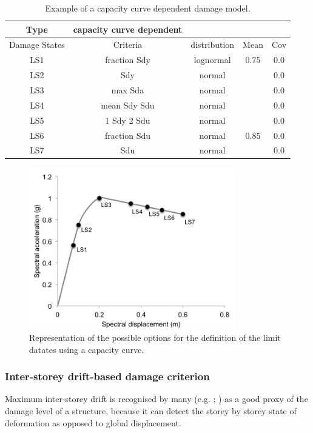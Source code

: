\begin {table}[htb]
\caption{Example of a capacity curve dependent damage model.}
\label{table:cc_dmg}
\begin{center}
  \begin{tabular}{ | c | c | c | c | c |}
  \hline
    Type & capacity curve dependent &  &  & \\ \hline
    Damage States & Criteria & distribution & Mean & Cov \\ \hline
    LS1 & fraction Sdy & lognormal & 0.75 & 0.0 \\ \hline
    LS2 & Sdy & normal &  & 0.0 \\ \hline
    LS3 & max Sda & normal &  & 0.0 \\ \hline
    LS4 & mean Sdy Sdu & normal &  & 0.0 \\ \hline
    LS5 & 1 Sdy 2 Sdu & normal &  & 0.0 \\ \hline
    LS6 & fraction Sdu & normal & 0.85 & 0.0 \\ \hline
    LS7 & Sdu & normal &  & 0.0 \\ \hline
  \end{tabular}
\end{center}
\end{table}

\begin{figure}[htb]
  \centering
      \includegraphics[width=9cm]{Figures/cc_damage_model.png}
  \caption{Representation of the possible options for the definition of the limit datates using a capacity curve.}
  \label{fig:cc_damage_model}
\end{figure}

\subsubsection{Inter-storey drift-based damage criterion}
Maximum inter-storey drift is recognised by many (e.g. \cite{VamvatsikosCornell2005}; \cite{RossettoElnashai2005}) as a good proxy of the damage level of a structure, because it can detect the storey by storey state of deformation as opposed to global displacement.

